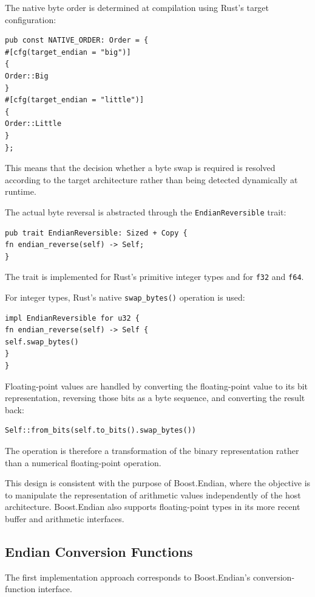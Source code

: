The native byte order is determined at compilation using Rust's target configuration:

\begin{lstlisting}[style=rustblock]
pub const NATIVE_ORDER: Order = {
#[cfg(target_endian = "big")]
{
Order::Big
}
#[cfg(target_endian = "little")]
{
Order::Little
}
};
\end{lstlisting}

This means that the decision whether a byte swap is required is resolved according to the target architecture rather 
than being detected dynamically at runtime.

The actual byte reversal is abstracted through the \texttt{EndianReversible} trait:

\begin{lstlisting}[style=rustblock]
pub trait EndianReversible: Sized + Copy {
fn endian_reverse(self) -> Self;
}
\end{lstlisting}

The trait is implemented for Rust's primitive integer types and for \texttt{f32} and \texttt{f64}.

For integer types, Rust's native \texttt{swap\_bytes()} operation is used:

\begin{lstlisting}[style=rustblock]
impl EndianReversible for u32 {
fn endian_reverse(self) -> Self {
self.swap_bytes()
}
}
\end{lstlisting}

Floating-point values are handled by converting the floating-point value to its bit representation, reversing those bits 
as a byte sequence, and converting the result back:

\begin{lstlisting}[style=rustblock]
Self::from_bits(self.to_bits().swap_bytes())
\end{lstlisting}

The operation is therefore a transformation of the binary representation rather than a numerical floating-point operation.

This design is consistent with the purpose of Boost.Endian, where the objective is to manipulate the representation of 
arithmetic values independently of the host architecture. Boost.Endian also supports floating-point types in its more 
recent buffer and arithmetic interfaces.

\subsection{Endian Conversion Functions}
The first implementation approach corresponds to Boost.Endian's conversion-function interface.

